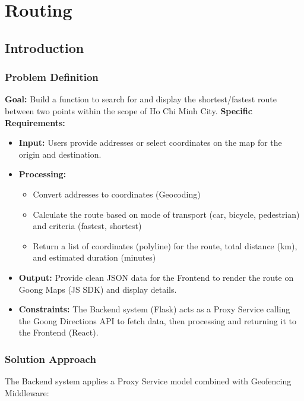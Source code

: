 \chapter{Routing}
\label{chap:routing}

\section{Introduction}
\subsection{Problem Definition}

\textbf{Goal:} Build a function to search for and display the shortest/fastest route between two points within the scope of Ho Chi Minh City.
\textbf{Specific Requirements:}
\begin{itemize}
    \item \textbf{Input:} Users provide addresses or select coordinates on the map for the origin and destination.
    \item \textbf{Processing:}
    \begin{itemize}
        \item Convert addresses to coordinates (Geocoding)
        \item Calculate the route based on mode of transport (car, bicycle, pedestrian) and criteria (fastest, shortest)
        \item Return a list of coordinates (polyline) for the route, total distance (km), and estimated duration (minutes)
    \end{itemize}
    \item \textbf{Output:} Provide clean JSON data for the Frontend to render the route on Goong Maps (JS SDK) and display details.
    \item \textbf{Constraints:} The Backend system (Flask) acts as a Proxy Service calling the Goong Directions API to fetch data, then processing and returning it to the Frontend (React).
\end{itemize}

\subsection{Solution Approach}

The Backend system applies a Proxy Service model combined with Geofencing Middleware:

